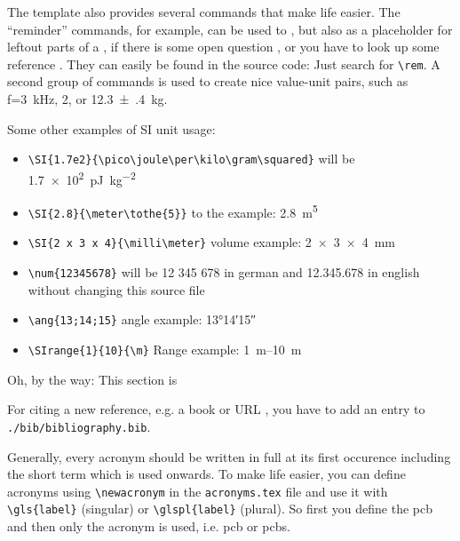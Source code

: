 
The template also provides several commands that make life easier. The ``reminder'' commands, for example, can be used to , but also as a placeholder for leftout parts of a \rem, if there is some open question \remq, or you have to look up some reference \remc. They can easily be found in the source code: Just search for \verb|\rem|. A second group of commands is used to create nice value-unit pairs, such as f=\SI{3}{\kilo\hertz}, \SI{2}{\permille}, or \SI{12.3(4)}{\kilo\gram}.

\vspace{5mm}
Some other examples of SI unit usage:
\begin{itemize}
\item \verb|\SI{1.7e2}{\pico\joule\per\kilo\gram\squared}| will be \SI{1.7e2}{\pico\joule\per\kilo\gram\squared}
\item \verb|\SI{2.8}{\meter\tothe{5}}| to the example: \SI{2.8}{\meter\tothe{5}}
\item \verb|\SI{2 x 3 x 4}{\milli\meter}| volume example: \SI{2 x 3 x 4}{\milli\meter}
\item \verb|\num{12345678}| will be 12 345 678 in german and 12.345.678 in english without changing this source file
\item \verb|\ang{13;14;15}| angle example: \ang{13;14;15}
\item \verb|\SIrange{1}{10}{\m}| Range example: \SIrange{1}{10}{\m}
\end{itemize}

\nxtpar\noindent
Oh, by the way: This section is \uc

For citing a new reference, e.g. a book \autocite{Mowlaee2016} or URL \autocite{Example:Url}, you have to add an entry to \verb|./bib/bibliography.bib|.

Generally, every acronym should be written in full at its first occurence including the short term which is used onwards. To make life easier, you can define acronyms using \verb|\newacronym| in the \verb|acronyms.tex| file and use it with \verb|\gls{label}| (singular) or \verb|\glspl{label}| (plural). So first you define the \gls{pcb} and then only the acronym is used, i.e. \gls{pcb} or \glspl{pcb}.

